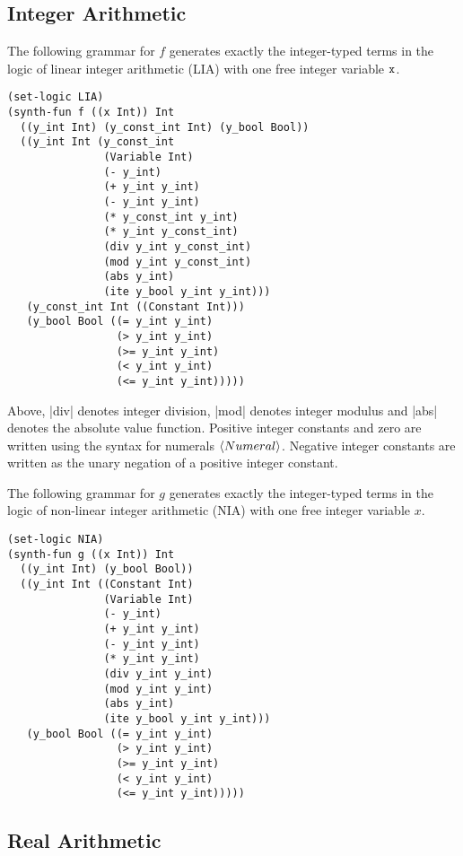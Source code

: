 \documentclass[english,a4paper,10pt]{article}
\begin{document}
\begin{appendix}
\subsection{Integer Arithmetic}

The following grammar for $f$
generates exactly the integer-typed terms in the logic of
linear integer arithmetic (LIA) with one free integer variable ${\tt x}$.
\begin{lstlisting}[language=SyGuS]
(set-logic LIA)
(synth-fun f ((x Int)) Int
  ((y_int Int) (y_const_int Int) (y_bool Bool))
  ((y_int Int (y_const_int
               (Variable Int)
               (- y_int)
               (+ y_int y_int)
               (- y_int y_int)
               (* y_const_int y_int)
               (* y_int y_const_int)
               (div y_int y_const_int)
               (mod y_int y_const_int)
               (abs y_int)
               (ite y_bool y_int y_int)))
   (y_const_int Int ((Constant Int)))
   (y_bool Bool ((= y_int y_int)
                 (> y_int y_int)
                 (>= y_int y_int)
                 (< y_int y_int)
                 (<= y_int y_int)))))
\end{lstlisting}
Above, \code|div| denotes integer division,
\code|mod| denotes integer modulus and \code|abs| denotes
the absolute value function.
Positive integer constants and zero are written using the syntax
for numerals $\left\langle Numeral\right\rangle$. Negative integer constants
are written as the unary negation of a positive integer constant.

The following grammar for $g$ generates exactly the integer-typed terms in the logic of
non-linear integer arithmetic (NIA)
with one free integer variable $x$.
\begin{lstlisting}[language=SyGuS]
(set-logic NIA)
(synth-fun g ((x Int)) Int
  ((y_int Int) (y_bool Bool))
  ((y_int Int ((Constant Int)
               (Variable Int)
               (- y_int)
               (+ y_int y_int)
               (- y_int y_int)
               (* y_int y_int)
               (div y_int y_int)
               (mod y_int y_int)
               (abs y_int)
               (ite y_bool y_int y_int)))
   (y_bool Bool ((= y_int y_int)
                 (> y_int y_int)
                 (>= y_int y_int)
                 (< y_int y_int)
                 (<= y_int y_int)))))
\end{lstlisting}

\subsection{Real Arithmetic}


\end{appendix}
\end{document}
